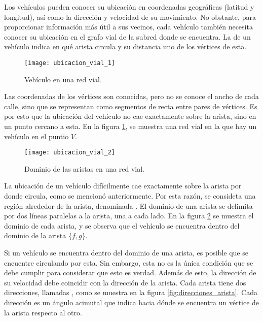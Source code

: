 \label{sec:ubicacion_vial}

Los vehículos pueden conocer su ubicación en coordenadas geográficas (latitud y
longitud), así como la dirección y velocidad de su movimiento. No obstante,
para proporcionar información más útil a sus vecinos, cada vehículo también
necesita conocer su ubicación en el grafo vial de la subred donde se encuentra.
La  de un vehículo indica en qué arista circula y su
distancia uno de los vértices de esta.

\begin{figure}[th!]
\centering
\texttt{[image: ubicacion\_vial\_1]} 
\decoRule
\caption[Vehículo en una red vial]{Vehículo en una red vial.}
\label{fig:ubicacion_vial_1}
\end{figure}

Las coordenadas de los vértices son conocidas, pero no se conoce el ancho de
cada calle, sino que se representan como segmentos de recta entre pares de
vértices. Es por esto que la ubicación del vehículo no cae exactamente sobre la
arista, sino en un punto cercano a esta. En la figura
\ref{fig:ubicacion_vial_1}, se muestra una red vial en la que hay un vehículo
en el puntio $V$.

\begin{figure}[th!]
\centering
\texttt{[image: ubicacion\_vial\_2]} 
\decoRule
\caption[Dominio de las aristas en una red vial]{Dominio de las aristas en una
red vial.}
\label{fig:ubicacion_vial_2}
\end{figure}

La ubicación de un vehículo difícilmente cae exactamente sobre la arista
por donde circula, como se mencionó anteriormente. Por esta razón, se
consideta una región alrededor de la arista, denominada .  El dominio de una arista se delimita por dos líneas paralelas a la
arista, una a cada lado. En la figura \ref{fig:ubicacion_vial_2} se muestra el
dominio de cada arista, y se observa que el vehículo se encuentra dentro del
dominio de la arista $\{f,g\}$.

Si un vehículo se encuentra dentro del dominio de una arista, es posible que se
encuentre circulando por esta. Sin embargo, esta no es la única condición que
se debe cumplir para considerar que esto es verdad. Además de esto, la
dirección de su velocidad debe coincidir con la dirección de la arista. Cada
arista tiene dos direcciones, llamadas , como
se muestra en la figura \ref{fig:direcciones_arista}. Cada dirección es un
ángulo acimutal que indica hacia dónde se encuentra un vértice de la arista
respecto al otro.

